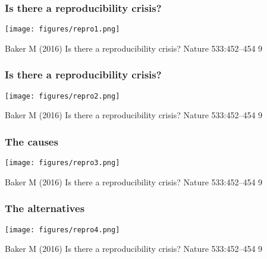\documentclass{beamer}
\begin{document}

\begin{frame}
  \frametitle{Is there a reproducibility crisis?}
\centering
\texttt{[image: figures/repro1.png]}

{\tiny Baker M (2016) Is there a reproducibility crisis? Nature 533:452–454 9}
\end{frame}


\begin{frame}
  \frametitle{Is there a reproducibility crisis?}
\centering
\texttt{[image: figures/repro2.png]}

{\tiny Baker M (2016) Is there a reproducibility crisis? Nature 533:452–454 9}
\end{frame}

\begin{frame}
  \frametitle{The causes}
\centering
\texttt{[image: figures/repro3.png]}

{\tiny Baker M (2016) Is there a reproducibility crisis? Nature 533:452–454 9}
\end{frame}

\begin{frame}
  \frametitle{The alternatives}
\centering
\texttt{[image: figures/repro4.png]}

{\tiny Baker M (2016) Is there a reproducibility crisis? Nature 533:452–454 9}
\end{frame}
\end{document}

